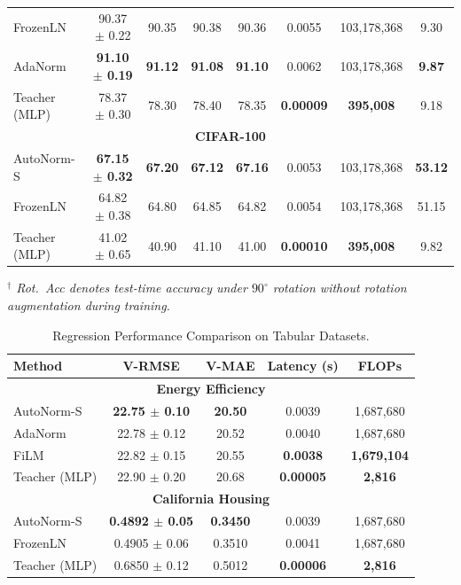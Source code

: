 \documentclass[final,3p,times,twocolumn]{elsarticle}
\begin{document}
\begin{table}[t]
{\begin{tabular}{lccccccc}
FrozenLN            & 90.37 $\pm$ 0.22 & 90.35 & 90.38 & 90.36 & 0.0055 & 103{,}178{,}368 & 9.30 \\
AdaNorm             & \textbf{91.10 $\pm$ 0.19} & \textbf{91.12} & \textbf{91.08} & \textbf{91.10} & 0.0062 & 103{,}178{,}368 & \textbf{9.87} \\
Teacher (MLP)       & 78.37 $\pm$ 0.30 & 78.30 & 78.40 & 78.35 & \textbf{0.00009} & \textbf{395{,}008} & 9.18 \\
\midrule
\multicolumn{8}{c}{\textbf{CIFAR-100}} \\
\midrule
AutoNorm-S          & \textbf{67.15 $\pm$ 0.32} & \textbf{67.20} & \textbf{67.12} & \textbf{67.16} & 0.0053 & 103{,}178{,}368 & \textbf{53.12} \\

FrozenLN            & 64.82 $\pm$ 0.38 & 64.80 & 64.85 & 64.82 & 0.0054 & 103{,}178{,}368 & 51.15 \\
Teacher (MLP)       & 41.02 $\pm$ 0.65 & 40.90 & 41.10 & 41.00 & \textbf{0.00010} & \textbf{395{,}008} & 9.82 \\
\bottomrule
\end{tabular}}
\textit{$^\dagger$ Rot.\ Acc denotes test-time accuracy under 
$90^\circ$ rotation without rotation augmentation during training.}
\end{table}

\begin{table}[htbp]
\centering
\caption{Regression Performance Comparison on Tabular Datasets.}
\label{tab:regression_results}
\begin{tabular}{lcccc}
\toprule
\textbf{Method} & \textbf{V-RMSE} & \textbf{V-MAE} & \textbf{Latency (s)} & \textbf{FLOPs} \\
\midrule
\multicolumn{5}{c}{\textbf{Energy Efficiency}} \\
\midrule
AutoNorm-S    & \textbf{22.75 $\pm$ 0.10} & \textbf{20.50} & 0.0039 & 1{,}687{,}680 \\
AdaNorm       & 22.78 $\pm$ 0.12 & 20.52 & 0.0040 & 1{,}687{,}680 \\
FiLM          & 22.82 $\pm$ 0.15 & 20.55 & \textbf{0.0038} & \textbf{1{,}679{,}104} \\
Teacher (MLP) & 22.90 $\pm$ 0.20 & 20.68 & \textbf{0.00005} & \textbf{2{,}816} \\
\midrule
\multicolumn{5}{c}{\textbf{California Housing}} \\
\midrule
AutoNorm-S    & \textbf{0.4892 $\pm$ 0.05} & \textbf{0.3450} & 0.0039 & 1{,}687{,}680 \\
FrozenLN      & 0.4905 $\pm$ 0.06 & 0.3510 & 0.0041 & 1{,}687{,}680 \\
Teacher (MLP) & 0.6850 $\pm$ 0.12 & 0.5012 & \textbf{0.00006} & \textbf{2{,}816} \\
\bottomrule
\end{tabular}
\end{table}
\end{document}
